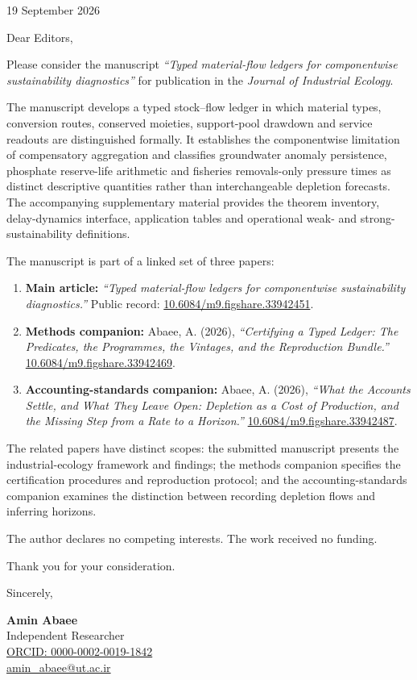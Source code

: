 \documentclass[11pt]{article}
\begin{document}
\begin{flushright}
19 September 2026
\end{flushright}

Dear Editors,

Please consider the manuscript \emph{``Typed material-flow ledgers for componentwise sustainability diagnostics''} for publication in the \emph{Journal of Industrial Ecology}.

The manuscript develops a typed stock--flow ledger in which material types, conversion routes, conserved moieties, support-pool drawdown and service readouts are distinguished formally. It establishes the componentwise limitation of compensatory aggregation and classifies groundwater anomaly persistence, phosphate reserve-life arithmetic and fisheries removals-only pressure times as distinct descriptive quantities rather than interchangeable depletion forecasts. The accompanying supplementary material provides the theorem inventory, delay-dynamics interface, application tables and operational weak- and strong-sustainability definitions.

The manuscript is part of a linked set of three papers:

\begin{enumerate}
\item \textbf{Main article:} \emph{``Typed material-flow ledgers for componentwise sustainability diagnostics.''} Public record: \href{https://doi.org/10.6084/m9.figshare.33942451}{10.6084/m9.figshare.33942451}.
\item \textbf{Methods companion:} Abaee, A. (2026), \emph{``Certifying a Typed Ledger: The Predicates, the Programmes, the Vintages, and the Reproduction Bundle.''} \href{https://doi.org/10.6084/m9.figshare.33942469}{10.6084/m9.figshare.33942469}.
\item \textbf{Accounting-standards companion:} Abaee, A. (2026), \emph{``What the Accounts Settle, and What They Leave Open: Depletion as a Cost of Production, and the Missing Step from a Rate to a Horizon.''} \href{https://doi.org/10.6084/m9.figshare.33942487}{10.6084/m9.figshare.33942487}.
\end{enumerate}

The related papers have distinct scopes: the submitted manuscript presents the industrial-ecology framework and findings; the methods companion specifies the certification procedures and reproduction protocol; and the accounting-standards companion examines the distinction between recording depletion flows and inferring horizons.

The author declares no competing interests. The work received no funding.

Thank you for your consideration.

Sincerely,

\textbf{Amin Abaee}\\
Independent Researcher\\
\href{https://orcid.org/0000-0002-0019-1842}{ORCID: 0000-0002-0019-1842}\\
\href{mailto:amin\_abaee@ut.ac.ir}{amin\_abaee@ut.ac.ir}
\end{document}
